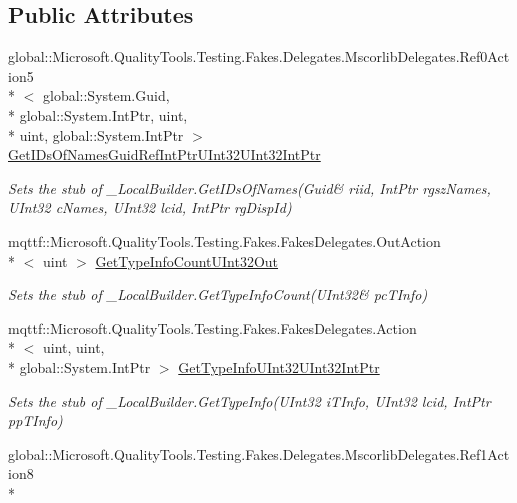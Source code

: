 \subsection*{Public Attributes}
\begin{DoxyCompactItemize}
\item 
global\-::\-Microsoft.\-Quality\-Tools.\-Testing.\-Fakes.\-Delegates.\-Mscorlib\-Delegates.\-Ref0\-Action5\\*
$<$ global\-::\-System.\-Guid, \\*
global\-::\-System.\-Int\-Ptr, uint, \\*
uint, global\-::\-System.\-Int\-Ptr $>$ \hyperlink{class_system_1_1_runtime_1_1_interop_services_1_1_fakes_1_1_stub___local_builder_abe1743cef8bbd5f5bdf7310bddf7ce29}{Get\-I\-Ds\-Of\-Names\-Guid\-Ref\-Int\-Ptr\-U\-Int32\-U\-Int32\-Int\-Ptr}
\begin{DoxyCompactList}\small\item\em Sets the stub of \-\_\-\-Local\-Builder.\-Get\-I\-Ds\-Of\-Names(Guid\& riid, Int\-Ptr rgsz\-Names, U\-Int32 c\-Names, U\-Int32 lcid, Int\-Ptr rg\-Disp\-Id)\end{DoxyCompactList}\item 
mqttf\-::\-Microsoft.\-Quality\-Tools.\-Testing.\-Fakes.\-Fakes\-Delegates.\-Out\-Action\\*
$<$ uint $>$ \hyperlink{class_system_1_1_runtime_1_1_interop_services_1_1_fakes_1_1_stub___local_builder_a5b22a5a3ab2e0a41f2ab0f1c17a645a1}{Get\-Type\-Info\-Count\-U\-Int32\-Out}
\begin{DoxyCompactList}\small\item\em Sets the stub of \-\_\-\-Local\-Builder.\-Get\-Type\-Info\-Count(U\-Int32\& pc\-T\-Info)\end{DoxyCompactList}\item 
mqttf\-::\-Microsoft.\-Quality\-Tools.\-Testing.\-Fakes.\-Fakes\-Delegates.\-Action\\*
$<$ uint, uint, \\*
global\-::\-System.\-Int\-Ptr $>$ \hyperlink{class_system_1_1_runtime_1_1_interop_services_1_1_fakes_1_1_stub___local_builder_a63d78a987e738cdf47220810257ebb2b}{Get\-Type\-Info\-U\-Int32\-U\-Int32\-Int\-Ptr}
\begin{DoxyCompactList}\small\item\em Sets the stub of \-\_\-\-Local\-Builder.\-Get\-Type\-Info(\-U\-Int32 i\-T\-Info, U\-Int32 lcid, Int\-Ptr pp\-T\-Info)\end{DoxyCompactList}\item 
global\-::\-Microsoft.\-Quality\-Tools.\-Testing.\-Fakes.\-Delegates.\-Mscorlib\-Delegates.\-Ref1\-Action8\\*

\end{DoxyCompactItemize}
